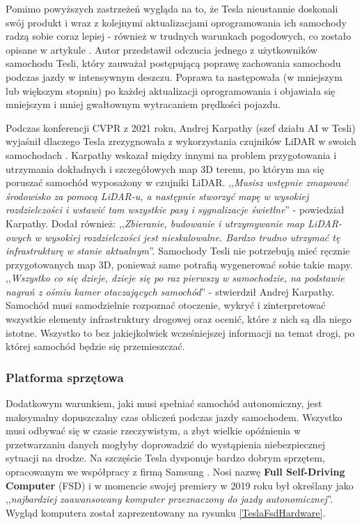 Pomimo powyższych zastrzeżeń wygląda na to, że Tesla nieustannie doskonali swój produkt i wraz z kolejnymi aktualizacjami oprogramowania ich samochody radzą sobie coraz lepiej - również w trudnych warunkach pogodowych, co zostało opisane w artykule \cite{klender:teslaOnHeavyRain}. Autor przedstawił odczucia jednego z użytkowników samochodu Tesli, który zauważał postępującą poprawę zachowania samochodu podczas jazdy w intensywnym deszczu. Poprawa ta następowała (w mniejszym lub większym stopniu) po każdej aktualizacji oprogramowania i objawiała się mniejszym i mniej gwałtownym wytracaniem prędkości pojazdu.

Podczas konferencji CVPR z 2021 roku, Andrej Karpathy (szef działu AI w Tesli) wyjaśnił dlaczego Tesla zrezygnowała z wykorzystania czujników LiDAR w swoich samochodach \cite{dickson:teslaDontNeedLidar}. Karpathy wskazał między innymi na problem przygotowania i utrzymania dokładnych i szczegółowych map 3D terenu, po którym ma się poruszać samochód wyposażony w czujniki LiDAR. ,,\textit{Musisz wstępnie zmapować środowisko za pomocą LiDAR-u, a następnie stworzyć mapę w wysokiej rozdzielczości i wstawić tam wszystkie pasy i sygnalizacje świetlne}'' - powiedział Karpathy. Dodał również: ,,\textit{Zbieranie, budowanie i utrzymywanie map LiDAR-owych w wysokiej rozdzielczości jest nieskalowalne. Bardzo trudno utrzymać tę infrastrukturę w stanie aktualnym}''. Samochody Tesli nie potrzebują mieć ręcznie przygotowanych map 3D, ponieważ same potrafią wygenerować sobie takie mapy. ,,\textit{Wszystko co się dzieje, dzieje się po raz pierwszy w samochodzie, na podstawie nagrań z ośmiu kamer otaczających samochód}'' - stwierdził Andrej Karpathy. Samochód musi samodzielnie rozpoznać otoczenie, wykryć i zinterpretować wszystkie elementy infrastruktury drogowej oraz ocenić, które z nich są dla niego istotne. Wszystko to bez jakiejkolwiek wcześniejszej informacji na temat drogi, po której samochód będzie się przemieszczać.

\subsubsection{Platforma sprzętowa}
Dodatkowym warunkiem, jaki musi spełniać samochód autonomiczny, jest maksymalny dopuszczalny czas obliczeń podczas jazdy samochodem. Wszystko musi odbywać się w czasie rzeczywistym, a zbyt wielkie opóźnienia w przetwarzaniu danych mogłyby doprowadzić do wystąpienia niebezpiecznej sytuacji na drodze. Na szczęście Tesla dysponuje bardzo dobrym sprzętem, opracowanym we współpracy z firmą Samsung \cite{wiggers:teslaDrivingChip, autopilotReview:fsdComputer}. Nosi nazwę \textbf{Full Self-Driving Computer} (FSD) i w momencie swojej premiery w 2019 roku był określany jako ,,\textit{najbardziej zaawansowany komputer przeznaczony do jazdy autonomicznej}''. Wygląd komputera został zaprezentowany na rysunku \ref{TeslaFsdHardware}.

